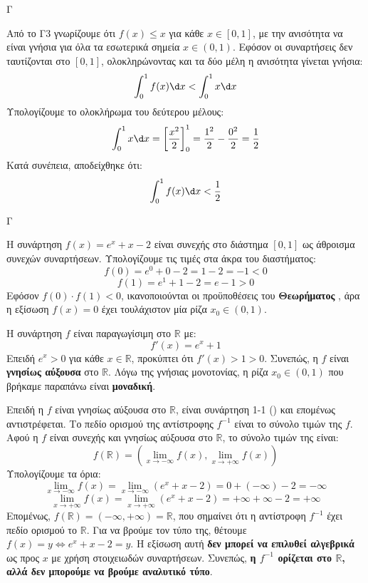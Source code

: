 \begin{thema}{Γ}
\begin{erwthma}
\item Από το Γ3 γνωρίζουμε ότι $f(x) \le x$ για κάθε $x \in [0, 1]$, με την ανισότητα να είναι γνήσια για όλα τα εσωτερικά σημεία $x \in (0,1)$. Εφόσον οι συναρτήσεις δεν ταυτίζονται στο $[0,1]$, ολοκληρώνοντας και τα δύο μέλη η ανισότητα γίνεται γνήσια:
\[ \int_0^1 f(x) \d x < \int_0^1 x \d x \]
Υπολογίζουμε το ολοκλήρωμα του δεύτερου μέλους:
\[ \int_0^1 x \d x = \left[ \frac{x^2}{2} \right]_0^1 = \frac{1^2}{2} - \frac{0^2}{2} = \frac{1}{2} \]
Κατά συνέπεια, αποδείχθηκε ότι:
\[ \int_0^1 f(x) \d x < \frac{1}{2} \]
\end{erwthma}
\end{thema}

\begin{thema}{Γ}
\begin{erwthma}
\item Η συνάρτηση $f(x) = e^x + x - 2$ είναι συνεχής στο διάστημα $[0, 1]$ ως άθροισμα συνεχών συναρτήσεων.
Υπολογίζουμε τις τιμές στα άκρα του διαστήματος:
\[ f(0) = e^0 + 0 - 2 = 1 - 2 = -1 < 0 \]
\[ f(1) = e^1 + 1 - 2 = e - 1 > 0 \]
Εφόσον $f(0) \cdot f(1) < 0$, ικανοποιούνται οι προϋποθέσεις του \textbf{Θεωρήματος }, άρα η εξίσωση $f(x) = 0$ έχει τουλάχιστον μία ρίζα $x_0 \in (0, 1)$.

Η συνάρτηση $f$ είναι παραγωγίσιμη στο $\mathbb{R}$ με:
\[ f'(x) = e^x + 1 \]
Επειδή $e^x > 0$ για κάθε $x \in \mathbb{R}$, προκύπτει ότι $f'(x) > 1 > 0$. Συνεπώς, η $f$ είναι \textbf{γνησίως αύξουσα} στο $\mathbb{R}$. 
Λόγω της γνήσιας μονοτονίας, η ρίζα $x_0 \in (0, 1)$ που βρήκαμε παραπάνω είναι \textbf{μοναδική}.

\item Επειδή η $f$ είναι γνησίως αύξουσα στο $\mathbb{R}$, είναι συνάρτηση 1-1 () και επομένως αντιστρέφεται. 
Το πεδίο ορισμού της αντίστροφης $f^{-1}$ είναι το σύνολο τιμών της $f$. Αφού η $f$ είναι συνεχής και γνησίως αύξουσα στο $\mathbb{R}$, το σύνολο τιμών της είναι:
\[ f(\mathbb{R}) = \left( \lim_{x \to -\infty} f(x), \lim_{x \to +\infty} f(x) \right) \]
Υπολογίζουμε τα όρια:
\[ \lim_{x \to -\infty} f(x) = \lim_{x \to -\infty} (e^x + x - 2) = 0 + (-\infty) - 2 = -\infty \]
\[ \lim_{x \to +\infty} f(x) = \lim_{x \to +\infty} (e^x + x - 2) = +\infty + \infty - 2 = +\infty \]
Επομένως, $f(\mathbb{R}) = (-\infty, +\infty) = \mathbb{R}$, που σημαίνει ότι η αντίστροφη $f^{-1}$ έχει πεδίο ορισμού το $\mathbb{R}$.
Για να βρούμε τον τύπο της, θέτουμε $f(x) = y \Leftrightarrow e^x + x - 2 = y$. Η εξίσωση αυτή \textbf{δεν μπορεί να επιλυθεί αλγεβρικά} ως προς $x$ με χρήση στοιχειωδών συναρτήσεων. Συνεπώς, \textbf{η $f^{-1}$ ορίζεται στο $\mathbb{R}$, αλλά δεν μπορούμε να βρούμε αναλυτικό τύπο}.


\end{erwthma}
\end{thema}
